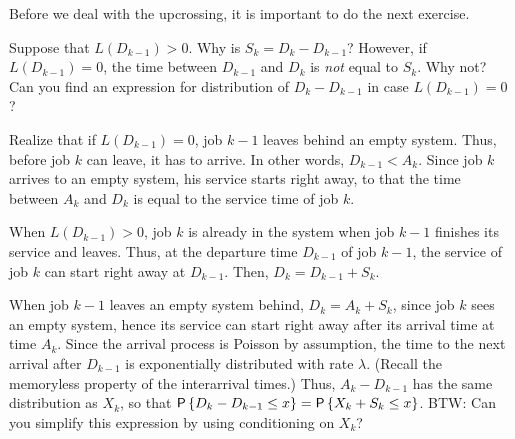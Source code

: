 Before we deal with the upcrossing, it is important to do the next exercise.
\begin{exercise} Suppose that $L(D_{k-1})>0$. Why is
  $S_k = D_k - D_{k-1}$?  However, if $L(D_{k-1}) = 0$, the time between
  $D_{k-1}$ and $D_k$ is \emph{not} equal to $S_k$. Why not? Can you find an expression for
  distribution of $D_k-D_{k-1}$ in case $L(D_{k-1})=0$?
  \begin{hint}
Realize that if $L(D_{k-1})=0$, job $k-1$ leaves behind an empty
  system. Thus, before job $k$ can leave, it has to arrive. In other
  words, $D_{k-1}<A_k$.  Since job $k$ arrives to an empty system,
  his service starts right away, to that the time between $A_k$ and
  $D_k$ is equal to the service time of job $k$.
  \end{hint}
\begin{solution}
  When $L(D_{k-1})>0$, job $k$ is already in the system when job $k-1$
  finishes its service and leaves. Thus, at the departure time
  $D_{k-1}$ of job $k-1$, the service of job $k$ can start right away
  at $D_{k-1}$. Then, $D_k=D_{k-1}+S_k$.


    When job $k-1$ leaves an empty system behind, $D_k= A_k + S_k$,
    since job $k$ sees an empty system, hence its service can start
    right away after its arrival time at time $A_k$. Since the arrival
    process is Poisson by assumption, the time to the next arrival
    after $D_{k-1}$ is exponentially distributed with rate
    $\lambda$. (Recall the memoryless property of the interarrival
    times.) Thus, $A_k - D_{k-1}$ has the same distribution as $X_k$,
    so that $\P{D_k - D_{k-1} \leq x} = \P{X_k + S_k\leq x}$. BTW: Can
    you simplify this expression by using conditioning on $X_k$?
\end{solution}
\end{exercise}

